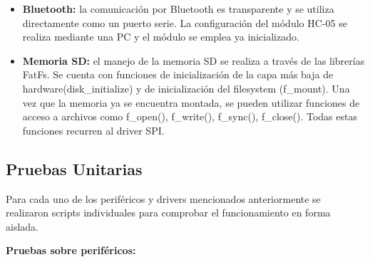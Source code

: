 \begin{itemize}
 	
 	\item \textbf{Bluetooth:} la comunicación por Bluetooth es transparente y se utiliza directamente como un puerto serie. La configuración del módulo HC-05 se realiza mediante una PC y el módulo se emplea ya inicializado.

	\item \textbf{Memoria SD:} el manejo de la memoria SD se realiza a través de las librerías FatFs. Se cuenta con funciones de inicialización de la capa más baja de hardware(disk\_initialize) y de inicialización del filesystem (f\_mount). Una vez que la memoria ya se encuentra montada, se pueden utilizar funciones de acceso a archivos como f\_open(), f\_write(), f\_sync(), f\_close(). Todas estas funciones recurren al driver SPI.

\end{itemize}

\subsection{Pruebas Unitarias} \label{pruebasUnitarias}


Para cada uno de los periféricos y drivers mencionados anteriormente se realizaron scripts individuales para comprobar el funcionamiento en forma aislada.

\textbf{Pruebas sobre periféricos:}

